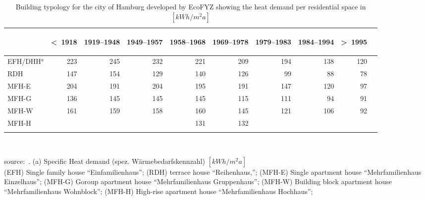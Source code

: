 \begin{table}[htbp]
  \centering
  \caption{Building typology for the city of Hamburg developed by EcoFYZ
      showing the heat demand per residential space in
  $[kWh/m^2a]$}\label{tab:EcoFYZ}%
  \begin{tabular}{l r rrr rrr rr}
    \addlinespace
    \toprule
    &
    \begin{sideways}\textless~1918\end{sideways}&  %
    \begin{sideways}1919--1948\end{sideways}&     %
    \begin{sideways}1949--1957\end{sideways}&     %
    \begin{sideways}1958--1968\end{sideways}&     %
    \begin{sideways}1969--1978\end{sideways}&     %
    \begin{sideways}1979--1983\end{sideways}&     %
    \begin{sideways}1984--1994\end{sideways}&     %
    \begin{sideways}\textgreater~1995\end{sideways}\\    %
    \midrule
EFH/DHH$^a$  &223 & 245 & 232& 221& 209& 194& 138& 120\\
RDH          &147 & 154 & 129& 140& 126& 99 & 88 & 78\\
MFH-E        &204 & 191 & 204& 195& 191& 147& 120& 97\\
MFH-G        &136 & 145 & 145& 145& 115& 111& 94 & 91\\
MFH-W  	  &161 & 159 & 158& 160& 145& 121& 106& 92\\
MFH-H        &    &     &    & 131& 132\\
    \bottomrule
    \addlinespace
    \end{tabular}\\
    \begin{footnotesize}
        source:~\cite[pp.~18]{Hermelink.2011}.
    (a) Specific Heat demand (spez. W\"armebedarfskennzahl)
    $[kWh/m^{2}a]$\\
(EFH) Single family house ``Einfamilienhaus'';
(RDH) terrace house ``Reihenhaus,'';
(MFH-E) Single apartment house ``Mehrfamilienhaus Einzelhaus'';
(MFH-G) Goroup apartment house ``Mehrfamilienhaus Gruppenhaus'';
(MFH-W) Building block apartment house ``Mehrfamilienhaus Wohnblock'';
(MFH-H) High-rise apartment house ``Mehrfamilienhaus Hochhaus'';
    \end{footnotesize}
\end{table}